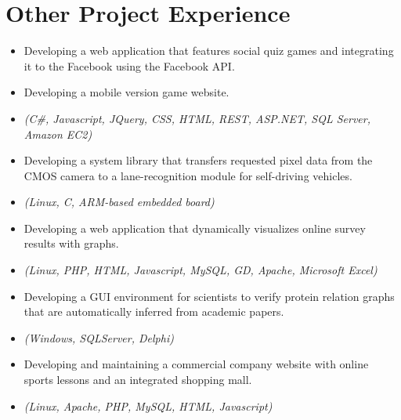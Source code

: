 \section{Other Project Experience}

\begin{itemize}
    \item{Developing a web application that features social quiz games and
        integrating it to the Facebook using the Facebook API.}
    \item{Developing a mobile version game website.}
    \item{\it\small(C\#, Javascript, JQuery, CSS, HTML, REST, ASP.NET, SQL Server, Amazon EC2)}
\end{itemize}

\begin{itemize}
    \item {Developing a system library that transfers requested pixel data from the CMOS camera
        to a lane-recognition module for self-driving vehicles.}
    \item{\it\small(Linux, C, ARM-based embedded board)}
\end{itemize}

\begin{itemize}
    \item{Developing a web application that dynamically visualizes online survey results with graphs.}
    \item{\it\small(Linux, PHP, HTML, Javascript, MySQL, GD, Apache, Microsoft Excel)}
\end{itemize}

\begin{itemize}
    \item {Developing a GUI environment for scientists to verify protein relation graphs
        that are automatically inferred from academic papers.}
    \item{\it\small(Windows, SQLServer, Delphi)}
\end{itemize}

\begin{itemize}
    \item{Developing and maintaining a commercial company website with
        online sports lessons and an integrated shopping mall.}
    \item{\it\small(Linux, Apache, PHP, MySQL, HTML, Javascript)}
\end{itemize}

